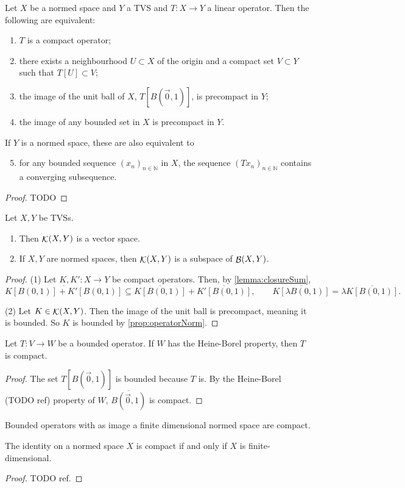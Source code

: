 \begin{proposition}
Let $X$ be a normed space and $Y$ a TVS and $T:X\to Y$ a linear operator. Then the following are equivalent:
\begin{enumerate}
\item $T$ is a compact operator;
\item there exists a neighbourhood $U \subset X$ of the origin and a compact set $V\subset Y$ such that $T[U] \subset V$;
\item the image of the unit ball of $X$, $T[B(\vec{0},1)]$, is precompact in $Y$;
\item the image of any bounded set in $X$ is precompact in $Y$.
\end{enumerate}
If $Y$ is a normed space, these are also equivalent to
\begin{enumerate} \setcounter{enumi}{4}
\item for any bounded sequence $(x_{n})_{n\in \mathbb{N}}$ in $X$, the sequence $(Tx_{n})_{n\in \mathbb{N} }$ contains a converging subsequence.
\end{enumerate}
\end{proposition}
\begin{proof}
TODO
\end{proof}


\begin{lemma}
Let $X,Y$ be TVSs.
\begin{enumerate}
\item Then $\mathop{\mathcal{K}}(X, Y)$ is a vector space.
\item If $X,Y$ are normed spaces, then $\mathop{\mathcal{K}}(X, Y)$ is a subspace of $\mathop{\mathcal{B}}(X, Y)$.
\end{enumerate}
\end{lemma}
\begin{proof}
(1) Let $K,K':X\to Y$ be compact operators. Then, by \ref{lemma:closureSum},
\[ \overline{K[B(0, 1)]+K'[B(0, 1)]} \subseteq \overline{K[B(0, 1)]}+\overline{K'[B(0, 1)]}, \qquad \overline{K[\lambda B(0, 1)]} = \lambda\overline{K[B(0, 1)]}. \]

(2) Let $K\in\mathop{\mathcal{K}}(X, Y)$. Then the image of the unit ball is precompact, meaning it is bounded. So $K$ is bounded by \ref{prop:operatorNorm}.
\end{proof}

\begin{lemma}
Let $T:V\to W$ be a bounded operator. If $W$ has the Heine-Borel property, then $T$ is compact.
\end{lemma}
\begin{proof}
The set $T[B(\vec{0},1)]$ is bounded because $T$ is. By the Heine-Borel (TODO ref) property of $W$, $\overline{B(\vec{0},1)}$ is compact.
\end{proof}
\begin{corollary}
Bounded operators with as image a finite dimensional normed space are compact.
\end{corollary}
\begin{corollary}
The identity on a normed space $X$ is compact \textup{if and only if} $X$ is finite-dimensional.
\end{corollary}
\begin{proof}
TODO ref. 
\end{proof}

